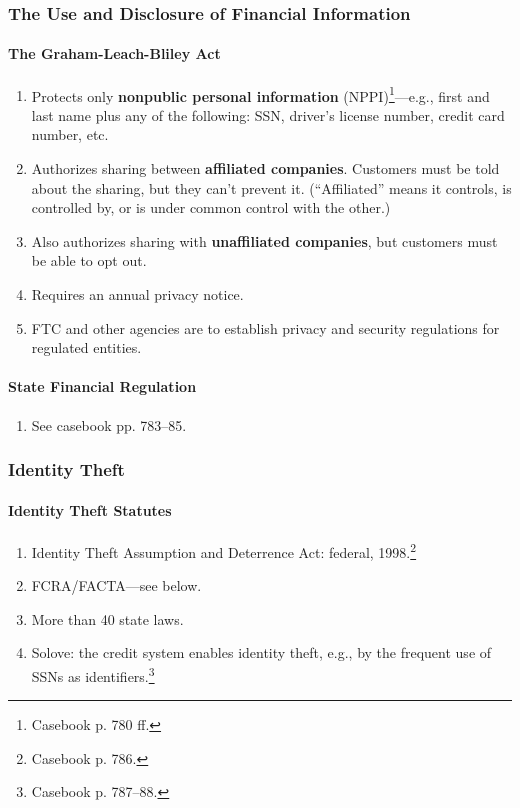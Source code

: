 \subsubsection{The Use and Disclosure of Financial Information}

\paragraph{The Graham-Leach-Bliley Act}

\begin{enumerate}
    \item Protects only \textbf{nonpublic personal information} 
    (NPPI)\footnote{Casebook p. 780 ff.}---e.g., first and last name plus any 
    of the following: SSN, driver's license number, credit card number, etc.
    \item Authorizes sharing between \textbf{affiliated companies}. Customers 
    must be told about the sharing, but they can't prevent it. (``Affiliated'' 
    means it controls, is controlled by, or is under common control with the 
    other.)
    \item Also authorizes sharing with \textbf{unaffiliated companies}, but 
    customers must be able to opt out.
    \item Requires an annual privacy notice.
    \item FTC and other agencies are to establish privacy and security 
    regulations for regulated entities.
\end{enumerate}

\paragraph{State Financial Regulation}

\begin{enumerate}
    \item See casebook pp. 783--85.
\end{enumerate}

\subsubsection{Identity Theft}

\paragraph{Identity Theft Statutes}

\begin{enumerate}
    \item Identity Theft Assumption and Deterrence Act: federal, 
    1998.\footnote{Casebook p. 786.}
    \item FCRA/FACTA---see below.
    \item More than 40 state laws.
    \item Solove: the credit system enables identity theft, e.g., by the 
    frequent use of SSNs as identifiers.\footnote{Casebook p. 787--88.}
\end{enumerate}

